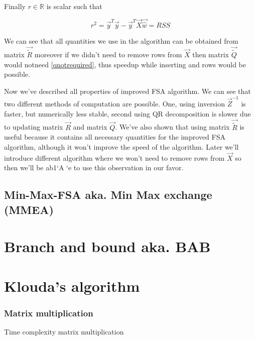 Finally $r \in \mathbb{R}$ is scalar such that 

\begin{equation}
	r^2 = \vec{y}^T\vec{y} - \vec{y}^T\vec{X}\vec{\hat{w}} = RSS
\end{equation}

\begin{remark} \label{qnotrequiredspeedupremark}
	We can see that all quantities we use in the algorithm can be obtained from matrix $\vec{\tilde{R}}$ moreover if we didn't need to remove rows from $\vec{X}$ then matrix $\vec{\tilde{Q}}$ would notneed \ref{qnotrequired}, thus speedup while inserting and rows would be possible. 
\end{remark}

Now we've described all properties of improved FSA algorithm. We can see that two different methods of computation are possible. One, using inversion $\vec{Z}^{-1}$ is faster, but numerically less stable, second using QR decomposition is slower due to updating matrix $\vec{R}$ and matrix $\vec{Q}$. We've also shown that using matrix $\vec{\tilde{R}}$ is useful because it contains all necessary quantities for the improved FSA algorithm, although it won't improve the speed of the algorithm. Later we'll introduce different algorithm where we won't need to remove rows from $\vec{X}$ so then we'll be ab1`A																		`e to use this observation in our favor.



\subsection{Min-Max-FSA aka. Min Max exchange (MMEA)}

\section{Branch and bound aka. BAB}  %
\section{Klouda's algorithm}


\subsubsection{Matrix multiplication}
Time complexity matrix multiplication

